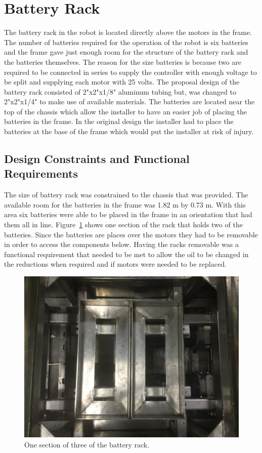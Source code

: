 \section{Battery Rack}
The battery rack in the robot is located directly above the motors in the frame. The number of batteries required for the operation of the robot is six batteries and the frame gave just enough room for the structure of the battery rack and the batteries themselves. The reason for the size batteries is because two are required to be connected in series to supply the controller with enough voltage to be split and supplying each motor with 25 volts. The proposal design of the battery rack consisted of 2"x2"x1/8" aluminum tubing but, was changed to 2"x2"x1/4" to make use of available materials. The batteries are located near the top of the chassis which allow the installer to have an easier job of placing the batteries in the frame. In the original design the installer had to place the batteries at the base of the frame which would put the installer at risk of injury.
\subsection{Design Constraints and Functional Requirements}
The size of battery rack was constrained to the chassis that was provided. The available room for the batteries in the frame was 1.82 m by 0.73 m. With this area six batteries were able to be placed in the frame in an orientation that had them all in line. Figure~\ref{fig:battery_rack_section} shows one section of the rack that holds two of the batteries. Since the batteries are places over the motors they had to be removable in order to access the components below. Having the racks removable was a functional requirement that needed to be met to allow the oil to be changed in the reductions when required and if motors were needed to be replaced.
\begin{figure}[H]
	\includegraphics[width=\linewidth]{images/battery_rack_mid_bld.jpg}
	\caption{One section of three of the battery rack.}
	\label{fig:battery_rack_section}
\end{figure}
